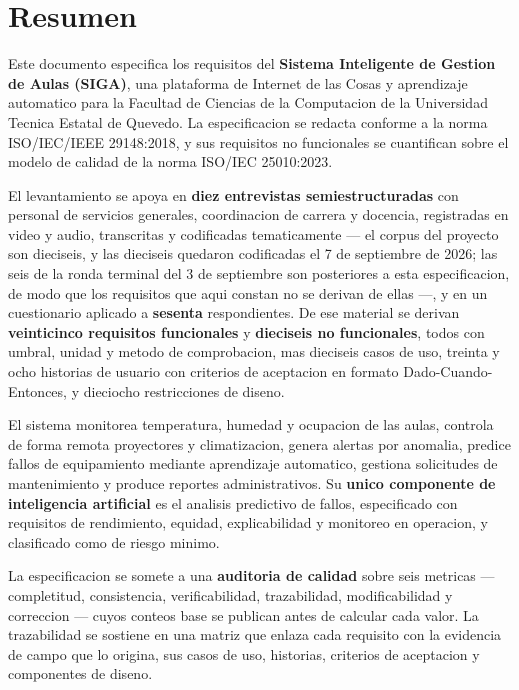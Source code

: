 \documentclass[11pt,a4paper]{article}
\begin{document}
\newpage

\section*{Resumen}

Este documento especifica los requisitos del \textbf{Sistema Inteligente de Gestion de
Aulas (SIGA)}, una plataforma de Internet de las Cosas y aprendizaje automatico para la
Facultad de Ciencias de la Computacion de la Universidad Tecnica Estatal de Quevedo. La
especificacion se redacta conforme a la norma ISO/IEC/IEEE 29148:2018, y sus requisitos no
funcionales se cuantifican sobre el modelo de calidad de la norma ISO/IEC 25010:2023.

El levantamiento se apoya en \textbf{diez entrevistas semiestructuradas} con personal de
servicios generales, coordinacion de carrera y docencia, registradas en video y audio,
transcritas y codificadas tematicamente --- el corpus del proyecto son dieciseis, y las
dieciseis quedaron codificadas el 7 de septiembre de 2026; las seis de la ronda terminal
del 3 de septiembre son posteriores a esta especificacion, de modo que los requisitos que
aqui constan no se derivan de ellas ---, y en un cuestionario aplicado a \textbf{sesenta}
respondientes. De ese material se derivan \textbf{veinticinco requisitos funcionales} y
\textbf{dieciseis no funcionales}, todos con umbral, unidad y metodo de comprobacion, mas
dieciseis casos de uso, treinta y ocho historias de usuario con criterios de aceptacion en
formato Dado-Cuando-Entonces, y dieciocho restricciones de diseno.

El sistema monitorea temperatura, humedad y ocupacion de las aulas, controla de forma
remota proyectores y climatizacion, genera alertas por anomalia, predice fallos de
equipamiento mediante aprendizaje automatico, gestiona solicitudes de mantenimiento y
produce reportes administrativos. Su \textbf{unico componente de inteligencia artificial}
es el analisis predictivo de fallos, especificado con requisitos de rendimiento, equidad,
explicabilidad y monitoreo en operacion, y clasificado como de riesgo minimo.

La especificacion se somete a una \textbf{auditoria de calidad} sobre seis metricas
--- completitud, consistencia, verificabilidad, trazabilidad, modificabilidad y correccion
--- cuyos conteos base se publican antes de calcular cada valor. La trazabilidad se
sostiene en una matriz que enlaza cada requisito con la evidencia de campo que lo origina,
sus casos de uso, historias, criterios de aceptacion y componentes de diseno.
\end{document}
